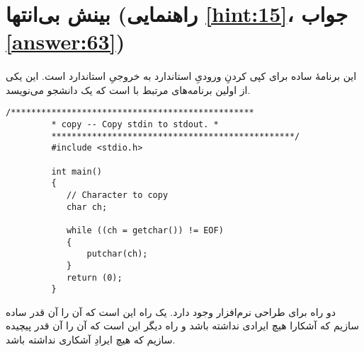\section[بینش بی‌انتها]{بینش بی‌انتها \protect{} (راهنمایی \ref{hint:15}، جواب \ref{answer:63})}
\paragraph{}\label{prog:72}
این برنامهٔ ساده برای کپی کردنِ ورودیِ استاندارد به خروجیِ استاندارد است. این یکی از اولین برنامه‌های مرتبط با  است که یک دانشجو می‌نویسد.

\begin{LTR}
    \begin{lstlisting}[style=C++Style]
         /************************************************
         * copy -- Copy stdin to stdout. *
         ************************************************/
         #include <stdio.h>

         int main()
         {
         	// Character to copy
         	char ch;

         	while ((ch = getchar()) != EOF)
         	{
         		putchar(ch);
         	}
         	return (0);
         }
    \end{lstlisting}
\end{LTR}

\begin{tcolorbox}
    دو راه برای طراحی نرم‌افزار وجود دارد. یک راه این است که آن را آن قدر ساده سازیم که آشکارا هیچ ایرادی نداشته باشد و راه دیگر این است که آن را آن قدر پیچیده سازیم که هیچ ایرادِ آشکاری نداشته باشد.

    \LTR
\end{tcolorbox}